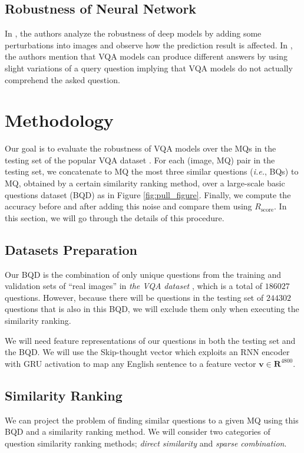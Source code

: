 \documentclass[letterpaper]{article}
\newcommand{\ie}{}\def\ie/{{\em i.e.}}
\newcommand{\rscore}{}\def\rscore/{$R_{\text{score}}$}
\begin{document}
\subsection{Robustness of Neural Network}
In \cite{61}, the authors analyze the robustness of deep models by adding some perturbations into images and observe how the prediction result is affected. In \cite{72}, the authors mention that VQA models can produce different answers by using slight variations of a query question implying that VQA models do not actually comprehend the asked question.

\section{Methodology}
Our goal is to evaluate the robustness of VQA models over the MQs in the testing set of the popular VQA dataset \cite{4}. For each (image, MQ) pair in the testing set, we concatenate to MQ the most three similar questions (\ie/, BQs) to MQ, obtained by a certain similarity ranking method, over a large-scale basic questions dataset (BQD) as in Figure \ref{fig:pull_figure}. Finally, we compute the accuracy before and after adding this noise and compare them using \rscore/. In this section, we will go through the details of this procedure.

\subsection{Datasets Preparation}
Our BQD is the combination of only unique questions from the training and validation sets of ``real images'' in \emph{the VQA dataset} \cite{4}, which is a total of $186027$ questions. However, because there will be questions in the testing set of $244302$ questions that is also in this BQD, we will exclude them only when executing the similarity ranking.

We will need feature representations of our questions in both the testing set and the BQD. We will use the Skip-thought vector \cite{43} which exploits an RNN encoder with GRU \cite{10} activation to map any English sentence to a feature vector $\mathbf{v} \in \mathbf{R}^{4800}$.

\subsection{Similarity Ranking}
We can project the problem of finding similar questions to a given MQ using this BQD and a similarity ranking method. We will consider two categories of question similarity ranking methods; \emph{direct similarity} and \emph{sparse combination}.
\end{document}
